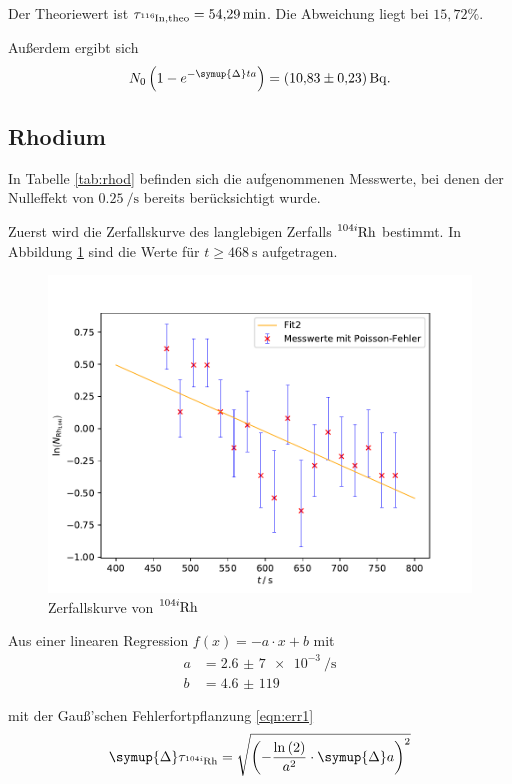 Der Theoriewert \cite{sample2} ist $\tau_{\ce{^{116}In}, \text{theo}} = \SI{54,29}{\min}$. Die Abweichung liegt bei $15,72 \%$.

Außerdem ergibt sich
\begin{equation*}
  N_0 \left(1 - e^{-\symup{\Delta}t a} \right) = \SI{10,83(23)}{\becquerel}.
\end{equation*}

\subsection{Rhodium \label{sec:rhod}}

In Tabelle \ref{tab:rhod} befinden sich die aufgenommenen Messwerte, bei denen der Nulleffekt von $\SI{0,25}{\per \s}$ bereits berücksichtigt wurde.


Zuerst wird die Zerfallskurve des langlebigen Zerfalls $\ce{^{104i}Rh}$ bestimmt.
In Abbildung \ref{fig:r1} sind die Werte für $t \geq \SI{468}{\s}$ aufgetragen.
\begin{figure}[H]
  \centering
  \includegraphics[width=\textwidth]{Plots/rhodi.pdf}
  \caption{Zerfallskurve von $\ce{^{104i}Rh}$}
  \label{fig:r1}
\end{figure}

Aus einer linearen Regression $f(x) = -a \cdot x + b$ mit
\begin{align*}
  a &= \SI{2,6(7)e-3}{\per \s} \\
  b &= \SI{4,6(119)}{}
\end{align*}

mit der Gauß'schen Fehlerfortpflanzung \eqref{eqn:err1}
\begin{equation}
  \symup{\Delta} \tau_{\ce{^{104i}Rh}} = \sqrt{\left(-\frac{\ln{(2)}}{a^2} \cdot \symup{\Delta}a \right)^2}
  \label{eqn:err1}
\end{equation}

